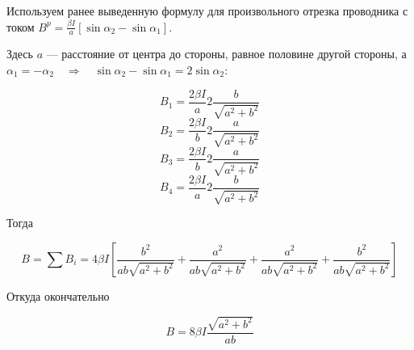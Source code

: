 \documentclass[a4paper,14pt]{extarticle}
\begin{document}
Используем ранее выведенную формулу для произвольного отрезка проводника с током $B^p=\frac{\beta I}{a}[\sin\alpha_2-\sin\alpha_1]$.

Здесь $a$ --- расстояние от центра до стороны, равное половине другой стороны, а $\alpha_1=-\alpha_2\quad\Rightarrow\quad \sin\alpha_2-\sin\alpha_1=2\sin\alpha_2$: 


\begin{equation*}
    B_1=\frac{2\beta I}{a}2\frac{b}{\sqrt{a^2+b^2}}
\end{equation*}
\begin{equation*}
    B_2=\frac{2\beta I}{b}2\frac{a}{\sqrt{a^2+b^2}}
\end{equation*}
\begin{equation*}
    B_3=\frac{2\beta I}{b}2\frac{a}{\sqrt{a^2+b^2}}
\end{equation*}
\begin{equation*}
    B_4=\frac{2\beta I}{a}2\frac{b}{\sqrt{a^2+b^2}}
\end{equation*}

Тогда 

\begin{equation*}
    B=\sum B_i=4\beta I
    \left[
        \frac{b^2}{ab\sqrt{a^2+b^2}}+
        \frac{a^2}{ab\sqrt{a^2+b^2}}+
        \frac{a^2}{ab\sqrt{a^2+b^2}}+
        \frac{b^2}{ab\sqrt{a^2+b^2}}
    \right]
\end{equation*}

Откуда окончательно

\begin{equation*}
    B=8\beta I \frac{\sqrt{a^2+b^2}}{ab}
\end{equation*}
\end{document}
